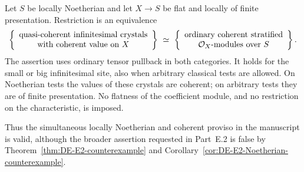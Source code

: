 \begin{theorem}\label{thm:DE-E2-coherent-Noetherian}
Let $S$ be locally Noetherian and let $X\to S$ be flat and locally of finite presentation.  Restriction is an equivalence
\[
 \left\{\begin{array}{c}
 \text{quasi-coherent infinitesimal crystals}\\
 \text{with coherent value on }X
 \end{array}\right\}
 \ \simeq\
 \left\{\begin{array}{c}
 \text{ordinary coherent stratified}\\
 \mathcal O_X\text{-modules over }S
 \end{array}\right\}.
\]
The assertion uses ordinary tensor pullback in both categories.  It holds for the small or big infinitesimal site, also when arbitrary classical tests are allowed.  On Noetherian tests the values of these crystals are coherent; on arbitrary tests they are of finite presentation.  No flatness of the coefficient module, and no restriction on the characteristic, is imposed.

Thus the simultaneous locally Noetherian and coherent proviso in the manuscript is valid, although the broader assertion requested in Part~E.2 is false by Theorem~\ref{thm:DE-E2-counterexample} and Corollary~\ref{cor:DE-E2-Noetherian-counterexample}.
\end{theorem}

